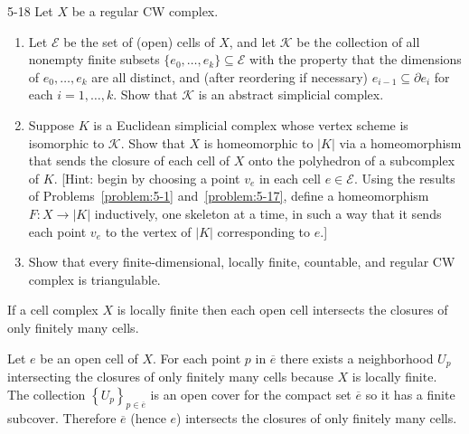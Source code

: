 \begin{problem}{5-18}\label{problem:5-18}
Let \(X\) be a regular CW complex.
\begin{enumerate}[label={(\alph*)}]
	\item Let \( \mathcal{E} \) be the set of (open) cells of \( X \), and let \( \mathcal{K} \) be the collection of all nonempty finite subsets \( \{e_{0}, \dots, e_{k}\} \subseteq \mathcal{E} \) with the property that the dimensions of \( e_{0}, \dots, e_{k} \) are all distinct, and (after reordering if necessary) \( e_{i-1} \subseteq \partial e_{i} \) for each \( i = 1, \dots, k \). Show that \( \mathcal{K} \) is an abstract simplicial complex.
	\item Suppose \( K \) is a Euclidean simplicial complex whose vertex scheme is isomorphic to \( \mathcal{K} \). Show that \( X \) is homeomorphic to \( \left\vert K \right\vert \) via a homeomorphism that sends the closure of each cell of \( X \) onto the polyhedron of a subcomplex of \( K \). [Hint: begin by choosing a point \( v_{e} \) in each cell \( e \in \mathcal{E} \). Using the results of Problems~\ref{problem:5-1} and~\ref{problem:5-17}, define a homeomorphism \( F : X \to \left\vert K \right\vert \) inductively, one skeleton at a time, in such a way that it sends each point \( v_{e}\) to the vertex of \( \left\vert K \right\vert\) corresponding to \( e \).]
	\item Show that every finite-dimensional, locally finite, countable, and regular CW complex is triangulable.
\end{enumerate}
\end{problem}

\begin{note}
	If a cell complex \( X \) is locally finite then each open cell intersects the closures of only finitely many cells.

	Let \( e \) be an open cell of \( X \). For each point \( p \) in \( \overline{e} \) there exists a neighborhood \( U_{p} \) intersecting the closures of only finitely many cells because \( X \) is locally finite. The collection \( {\left\{ U_{p} \right\}}_{p \in \overline{e}} \) is an open cover for the compact set \( \overline{e} \) so it has a finite subcover. Therefore \( \overline{e} \) (hence \( e \)) intersects the closures of only finitely many cells.
\end{note}

